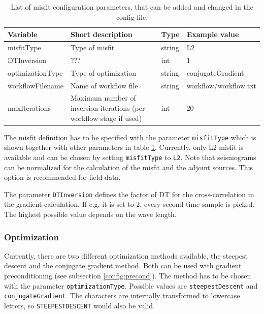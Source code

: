 \documentclass[pdftex,a4paper,parskip,listof=totoc,bibliography=totoc,onehalfspacing,12pt]{scrreprt}
\begin{document}
\begin{table}[h!]
\caption[List of misfit configuration parameters.]{List of misfit configuration parameters, that can be added and changed in the config-file.}\label{tab:config_misfit}
\centering
\begin{adjustbox}{width=1\textwidth,center=\textwidth}
	\begin{tabular}{llll}
	\toprule
         Variable                 & Short description                                                   & Type   & Example value \\
	\midrule                 
         misfitType               & Type of misfit                                                      & string & L2  \\
         DTInversion              & ???                                                                 &  int   & 1 \\
         optimizationType         & Type of optimization                                                & string & conjugateGradient \\
         workflowFilename         & Name of workflow file                                               & string & workflow/workflow.txt \\
         maxIterations            & Maximum number of inversion iterations (per workflow stage if used) &  int   & 20  \\
	\bottomrule
	\end{tabular}
	\end{adjustbox}
\end{table}

The misfit definition has to be specified with the parameter \verb+misfitType+ which is shown together with other parameters in table \ref{tab:config_misfit}. Currently, only L2 misfit is available and can be chosen by setting \verb+misfitType+ to \verb+L2+. Note that seismograms can be normalized for the calculation of the misfit and the adjoint sources. This option is recommended for field data.

The parameter \verb+DTInversion+ defines the factor of DT for the cross-correlation in the gradient calculation. If e.g. it is set to 2, every second time sample is picked. The highest possible value depends on the wave length.

\subsubsection{Optimization}
Currently, there are two different optimization methods available, the steepest descent and the conjugate gradient method. Both can be used with gradient preconditioning (see subsection \ref{config:precond}). The method has to be chosen with the parameter \verb+optimizationType+. Possible values are \verb+steepestDescent+ and \verb+conjugateGradient+. The characters are internally transformed to lowercase letters, so \verb+STEEPESTDESCENT+ would also be valid.
\end{document}
